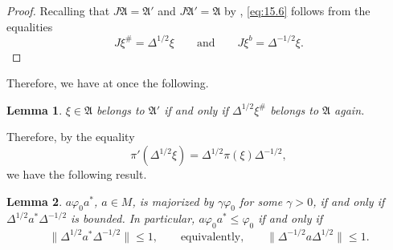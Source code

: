 \documentclass[12pt,b5paper,twoside]{article}
\theoremstyle{takesaki}
\newtheorem{lemma}{Lemma}[section]
\numberwithin{equation}{section}
\begin{document}
\begin{proof}
Recalling that $J\mathfrak A=\mathfrak A'$ and
$J\mathfrak A'=\mathfrak A$ by , \eqref{eq:15.6}
follows from the equalities
\[
  J\xi^{\#}=\Delta^{1/2}\xi
  \qquad\text{and}\qquad
  J\xi^{b}=\Delta^{-1/2}\xi.
\]
\end{proof}

Therefore, we have at once the following.

\begin{lemma}
\label{lem:15.14}
$\xi\in\mathfrak A$ belongs to $\mathfrak A'$ if and only if
$\Delta^{1/2}\xi^{\#}$ belongs to $\mathfrak A$ again.
\end{lemma}

Therefore, by the equality
\[
  \pi'(\Delta^{1/2}\xi)
  =\Delta^{1/2}\pi(\xi)\Delta^{-1/2},
\]
we have the following result.

\begin{lemma}
\label{lem:15.15}
$a\varphi_0a^*$, $a\in M$, is majorized by $\gamma\varphi_0$ for some
$\gamma>0$, if and only if $\Delta^{1/2}a^*\Delta^{-1/2}$ is bounded.
In particular, $a\varphi_0a^*\leq\varphi_0$ if and only if
\[
  \lVert\Delta^{1/2}a^*\Delta^{-1/2}\rVert\leq1,
  \qquad\text{equivalently,}\qquad
  \lVert\Delta^{-1/2}a\Delta^{1/2}\rVert\leq1.
\]
\end{lemma}
\end{document}
